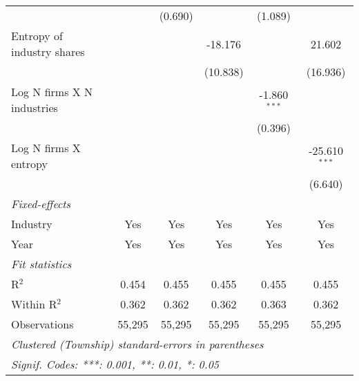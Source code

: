\begin{tabular}{lccccc}
                                        &                  & (0.690)          &                  & (1.089)          &   \\   
   Entropy of industry shares           &                  &                  & -18.176          &                  & 21.602\\   
                                        &                  &                  & (10.838)         &                  & (16.936)\\   
   Log N firms X N industries           &                  &                  &                  & -1.860$^{***}$   &   \\   
                                        &                  &                  &                  & (0.396)          &   \\   
   Log N firms X entropy                &                  &                  &                  &                  & -25.610$^{***}$\\   
                                        &                  &                  &                  &                  & (6.640)\\   
   \midrule
   \emph{Fixed-effects}\\
   Industry                             & Yes              & Yes              & Yes              & Yes              & Yes\\  
   Year                                 & Yes              & Yes              & Yes              & Yes              & Yes\\  
   \midrule
   \emph{Fit statistics}\\
   R$^2$                                & 0.454            & 0.455            & 0.455            & 0.455            & 0.455\\  
   Within R$^2$                         & 0.362            & 0.362            & 0.362            & 0.363            & 0.362\\  
   Observations                         & 55,295           & 55,295           & 55,295           & 55,295           & 55,295\\  
   \midrule \midrule
   \multicolumn{6}{l}{\emph{Clustered (Township) standard-errors in parentheses}}\\
   \multicolumn{6}{l}{\emph{Signif. Codes: ***: 0.001, **: 0.01, *: 0.05}}\\
\end{tabular}
\par\endgroup
